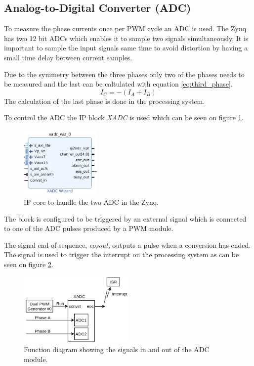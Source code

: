 \subsection{Analog-to-Digital Converter (ADC)}

To measure the phase currents once per PWM cycle an ADC is used. The Zynq has two 12 bit ADCs which enables it to sample two signals simultaneously. It is important to sample the input signals same time to avoid distortion by having a small time delay between current samples. 

Due to the symmetry between the three phases only two of the phases needs to be measured and the last can be caltulated with equation \ref{eq:third_phase}.
\begin{equation}
    I_C = -(I_A + I_B)
    \label{eq:third_phase}
\end{equation}
The calculation of the last phase is done in the processing system.

To control the ADC the IP block \textit{XADC} is used which can be seen on figure \ref{fig:adc_module}. 

\begin{figure}[H]
	\centering
	\includegraphics[width=0.35\textwidth]{pictures/software/adc.png}
	\caption{IP core to handle the two ADC in the Zynq.}
	\label{fig:adc_module}
\end{figure}

The block is configured to be triggered by an external signal which is connected to one of the ADC pulses produced by a PWM module.

The signal end-of-sequence, \textit{eos\textunderscore out}, outputs a pulse when a conversion has ended. The signal is used to trigger the interrupt on the processing system as can be seen on figure \ref{fig:adc_block_diagram}.

\begin{figure}[H]
	\centering
	\includegraphics[width=0.5\textwidth]{pictures/software/adc_block_diagram.png}
	\caption{Function diagram showing the signals in and out of the ADC module.}
	\label{fig:adc_block_diagram}
\end{figure}



